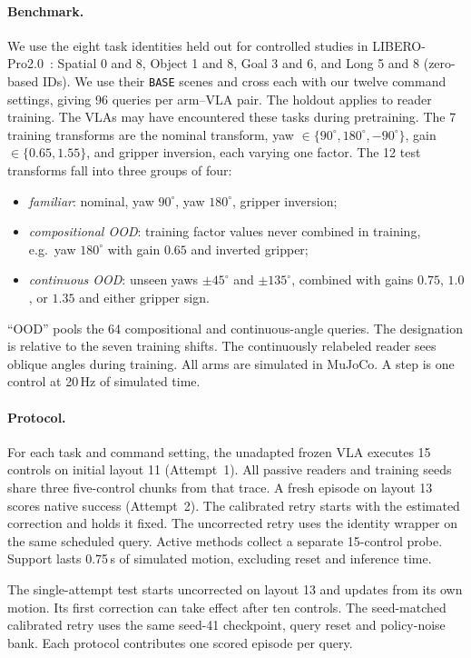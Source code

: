 \documentclass{article}
\theoremstyle{plain}
\theoremstyle{remark}
\begin{document}
\paragraph{Benchmark.} We use the eight task identities held out for controlled studies in LIBERO-Pro2.0~\citep{liu2023libero,liberopro2026}: Spatial 0 and 8, Object 1 and 8, Goal 3 and 6, and Long 5 and 8 (zero-based IDs). We use their \texttt{BASE} scenes and cross each with our twelve command settings, giving 96 queries per arm--VLA pair. The holdout applies to reader training. The VLAs may have encountered these tasks during pretraining. The 7 training transforms are the nominal transform, yaw $\in \{90^\circ, 180^\circ, -90^\circ\}$, gain $\in \{0.65, 1.55\}$, and gripper inversion, each varying one factor. The 12 test transforms fall into three groups of four:
\begin{itemize}
  \item \emph{familiar}: nominal, yaw $90^\circ$, yaw $180^\circ$, gripper inversion;
  \item \emph{compositional OOD}: training factor values never combined in training, e.g.\ yaw $180^\circ$ with gain $0.65$ and inverted gripper;
  \item \emph{continuous OOD}: unseen yaws $\pm 45^\circ$ and $\pm 135^\circ$, combined with gains $0.75$, $1.0$, or $1.35$ and either gripper sign.
\end{itemize}
``OOD'' pools the 64 compositional and continuous-angle queries. The designation is relative to the seven training shifts. The continuously relabeled reader sees oblique angles during training. All arms are simulated in MuJoCo. A step is one control at 20\,Hz of simulated time.

\paragraph{Protocol.} For each task and command setting, the unadapted frozen VLA executes 15 controls on initial layout 11 (Attempt~1). All passive readers and training seeds share three five-control chunks from that trace. A fresh episode on layout 13 scores native success (Attempt~2). The calibrated retry starts with the estimated correction and holds it fixed. The uncorrected retry uses the identity wrapper on the same scheduled query. Active methods collect a separate 15-control probe. Support lasts 0.75\,s of simulated motion, excluding reset and inference time.

The single-attempt test starts uncorrected on layout 13 and updates from its own motion. Its first correction can take effect after ten controls. The seed-matched calibrated retry uses the same seed-41 checkpoint, query reset and policy-noise bank. Each protocol contributes one scored episode per query.
\end{document}
